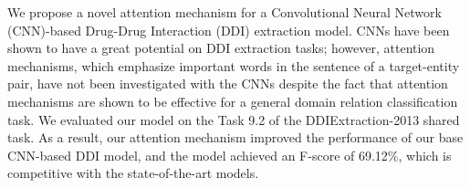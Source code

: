 We propose a novel attention mechanism for a Convolutional Neural Network (CNN)-based Drug-Drug Interaction (DDI) extraction model. CNNs have been shown to have a great potential on DDI extraction tasks; however, attention mechanisms, which emphasize important words in the sentence of a target-entity pair, have not been investigated with the CNNs despite the fact that attention mechanisms are shown to be effective for a general domain relation classification task. We evaluated our model on the Task 9.2 of the DDIExtraction-2013 shared task. As a result, our attention mechanism improved the performance of our base CNN-based DDI model, and the model achieved an F-score of 69.12\%, which is competitive with the state-of-the-art models.

